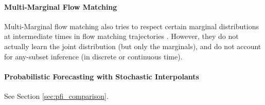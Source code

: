 \paragraph{Multi-Marginal Flow Matching}

Multi-Marginal flow matching also tries to respect certain marginal distributions at intermediate times in flow matching trajectories \cite{kviman2025multi}. However, they do not actually learn the joint distribution (but only the marginals), and do not account for any-subset inference (in discrete or continuous time).

\paragraph{Probabilistic Forecasting with Stochastic Interpolants}

See Section \ref{sec:pfi_comparison}.

